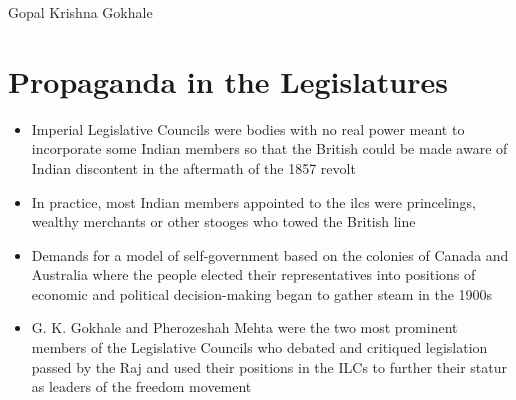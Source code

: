 \begin{marginfigure}[-3.5in]
    \caption{Gopal Krishna Gokhale}
\end{marginfigure}

\section{Propaganda in the Legislatures}
\begin{itemize}
    \item Imperial Legislative Councils were bodies with no real power meant to incorporate some Indian members so that the British could be made aware of Indian discontent in the aftermath of the 1857 revolt
    \item In practice, most Indian members appointed to the \glspl{ilc} were princelings, wealthy merchants or other stooges who towed the British line
    \item Demands for a model of self-government based on the colonies of Canada and Australia where the people elected their representatives into positions of economic and political decision-making began to gather steam in the 1900s
    \item G. K. Gokhale and Pherozeshah Mehta were the two most prominent members of the Legislative Councils who debated and critiqued legislation passed by the Raj and used their positions in the ILCs to further their statur as leaders of the freedom movement
\end{itemize}

